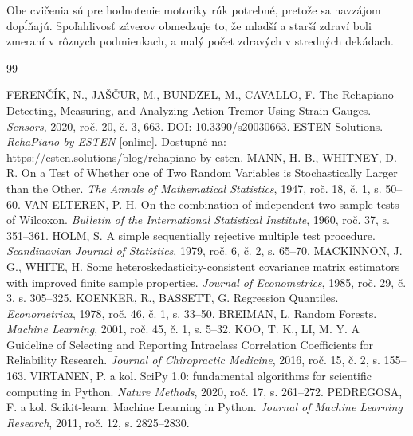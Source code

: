 \documentclass[12pt,a4paper]{article}
\begin{document}
Obe cvičenia sú pre hodnotenie motoriky rúk potrebné, pretože sa navzájom dopĺňajú. Spoľahlivosť záverov obmedzuje to, že mladší a starší zdraví boli zmeraní
v rôznych podmienkach, a malý počet zdravých v stredných dekádach.

\clearpage
\renewcommand{\refname}{Zoznam použitej literatúry}
\begin{thebibliography}{99}
\setlength{\itemsep}{2pt}
 FERENČÍK, N., JAŠČUR, M., BUNDZEL, M., CAVALLO, F. The Rehapiano -- Detecting, Measuring,
  and Analyzing Action Tremor Using Strain Gauges. \textit{Sensors}, 2020, roč. 20, č. 3, 663.
  DOI: 10.3390/s20030663.
 ESTEN Solutions. \textit{RehaPiano by ESTEN} [online]. Dostupné na:
  \url{https://esten.solutions/blog/rehapiano-by-esten}.
 MANN, H. B., WHITNEY, D. R. On a Test of Whether one of Two Random Variables is Stochastically
  Larger than the Other. \textit{The Annals of Mathematical Statistics}, 1947, roč. 18, č. 1, s. 50--60.
 VAN ELTEREN, P. H. On the combination of independent two-sample tests of Wilcoxon.
  \textit{Bulletin of the International Statistical Institute}, 1960, roč. 37, s. 351--361.
 HOLM, S. A simple sequentially rejective multiple test procedure. \textit{Scandinavian Journal of
  Statistics}, 1979, roč. 6, č. 2, s. 65--70.
 MACKINNON, J. G., WHITE, H. Some heteroskedasticity-consistent covariance matrix estimators
  with improved finite sample properties. \textit{Journal of Econometrics}, 1985, roč. 29, č. 3, s. 305--325.
 KOENKER, R., BASSETT, G. Regression Quantiles. \textit{Econometrica}, 1978, roč. 46, č. 1,
  s. 33--50.
 BREIMAN, L. Random Forests. \textit{Machine Learning}, 2001, roč. 45, č. 1, s. 5--32.
 KOO, T. K., LI, M. Y. A Guideline of Selecting and Reporting Intraclass Correlation Coefficients for
  Reliability Research. \textit{Journal of Chiropractic Medicine}, 2016, roč. 15, č. 2, s. 155--163.
 VIRTANEN, P. a kol. SciPy 1.0: fundamental algorithms for scientific computing in Python.
  \textit{Nature Methods}, 2020, roč. 17, s. 261--272.
 PEDREGOSA, F. a kol. Scikit-learn: Machine Learning in Python. \textit{Journal of Machine
  Learning Research}, 2011, roč. 12, s. 2825--2830.
\end{thebibliography}
\end{document}
